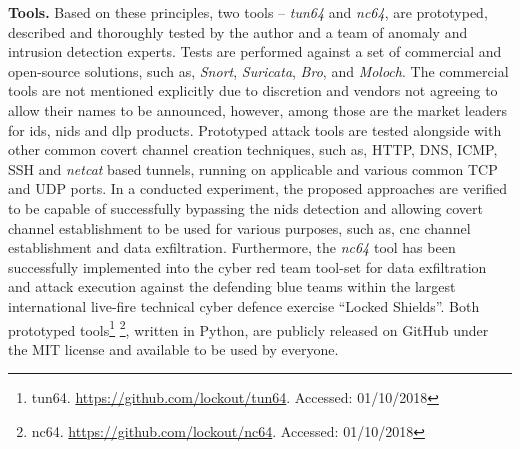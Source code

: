 \textbf{Tools.}
Based on these principles, two tools -- \textit{tun64} and \textit{nc64}, are prototyped, described and thoroughly tested by the author and a team of anomaly and intrusion detection experts. Tests are performed against a set of commercial and open-source solutions, such as, \textit{Snort}, \textit{Suricata}, \textit{Bro}, and \textit{Moloch}. The commercial tools are not mentioned explicitly due to discretion and vendors not agreeing to allow their names to be announced, however, among those are the market leaders for \gls{ids}, \gls{nids} and \gls{dlp} products. Prototyped attack tools are tested alongside with other common covert channel creation techniques, such as, HTTP, DNS, ICMP, SSH and \textit{netcat} based tunnels, running on applicable and various common TCP and UDP ports. In a conducted experiment, the proposed approaches are verified to be capable of successfully bypassing the \gls{nids} detection and allowing covert channel establishment to be used for various purposes, such as, \gls{cnc} channel establishment and data exfiltration. Furthermore, the \textit{nc64} tool has been successfully implemented into the cyber red team tool-set for data exfiltration and attack execution against the defending blue teams within the largest international live-fire technical cyber defence exercise ``Locked Shields''.
Both prototyped tools\footnote{tun64. \url{https://github.com/lockout/tun64}. Accessed: 01/10/2018} \footnote{nc64. \url{https://github.com/lockout/nc64}. Accessed: 01/10/2018}, written in Python, are publicly released on GitHub under the MIT license and available to be used by everyone.

